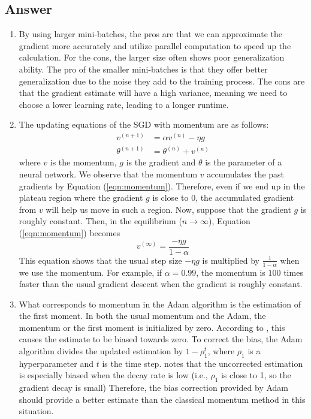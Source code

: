 \documentclass[
	12pt, %
]{../Template/fphw}
\begin{document}

\subsection*{Answer} 
\begin{enumerate}[label = (\arabic*)]
\item By using larger mini-batches, the pros are that we can approximate the gradient more accurately and utilize parallel computation to speed up the calculation. For the cons, the larger size often shows poor generalization ability. The pro of the smaller mini-batches is that they offer better generalization due to the noise they add to the training process. The cons are that the gradient estimate will have a high variance, meaning we need to choose a lower learning rate, leading to a longer runtime.
\item The updating equations of the SGD with momentum are as follows:
\begin{align}
    v^{(n+1)} &= \alpha v^{(n)} - \eta g \label{eqn:momentum} \\
    \theta^{(n+1)} &= \theta^{(n)}+v^{(n)}
\end{align}
where $v$ is the momentum, $g$ is the gradient and $\theta$ is the parameter of a neural network. We observe that the momentum $v$ accumulates the past gradients by Equation (\ref{eqn:momentum}). Therefore, even if we end up in the plateau region where the gradient $g$ is close to $0$, the accumulated gradient from $v$ will help us move in such a region. Now, suppose that the gradient $g$ is roughly constant. Then, in the equilibrium ($n\to \infty$), Equation (\ref{eqn:momentum}) becomes
\begin{equation}
    v^{(\infty)} = \frac{-\eta g}{1-\alpha}
\end{equation}
This equation shows that the usual step size $-\eta g$ is multiplied by $\frac{1}{1-\alpha}$ when we use the momentum. For example, if $\alpha=0.99$, the momentum is $100$ times faster than the usual gradient descent when the gradient is roughly constant.
\item What corresponds to momentum in the Adam algorithm is the estimation of the first moment. In both the usual momentum and the Adam, the momentum or the first moment is initialized by zero. According to \cite{adam}, this causes the estimate to be biased towards zero. To correct the bias, the Adam algorithm divides the updated estimation by $1-\rho_1^t$, where $\rho_1$ is a hyperparameter and $t$ is the time step. \cite{adam} notes that the uncorrected estimation is especially biased when the decay rate is low (i.e., $\rho_1$ is close to 1, so the gradient decay is small) Therefore, the bias correction provided by Adam should provide a better estimate than the classical momentum method in this situation.


\end{enumerate}
\end{document}
